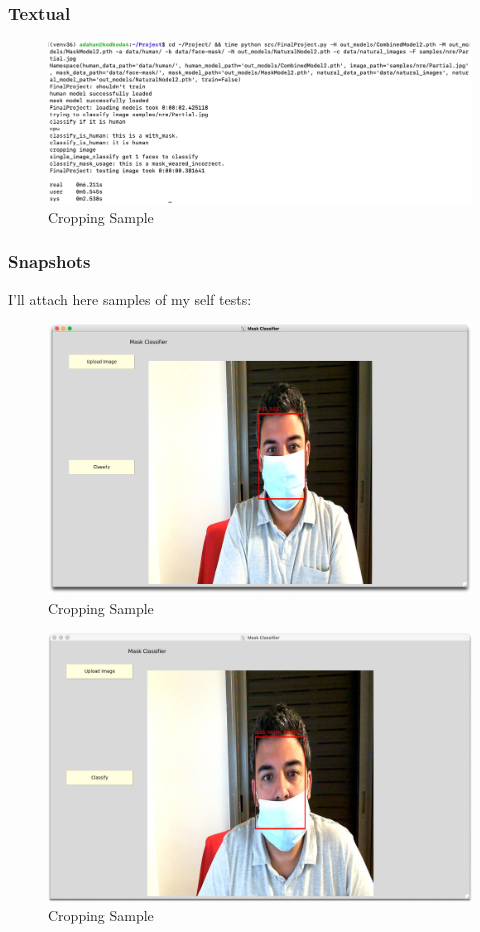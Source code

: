 \subsubsection{Textual}
\begin{figure}[H]
    \centering
    \includegraphics[width=1\textwidth]{images/Demo/Textual.png}
    \caption{Cropping Sample}
    \label{fig:Textual}
\end{figure}
\subsubsection{Snapshots}
I'll attach here samples of my self tests:
\begin{figure}[H]
    \centering
    \includegraphics[width=1\textwidth]{images/Demo/Masked.png}
    \caption{Cropping Sample}
    \label{fig:MaskedAmir}
\end{figure}

\begin{figure}[H]
    \centering
    \includegraphics[width=1\textwidth]{images/Demo/Partial.png}
    \caption{Cropping Sample}
    \label{fig:PartialMaskedAmir}
\end{figure}

